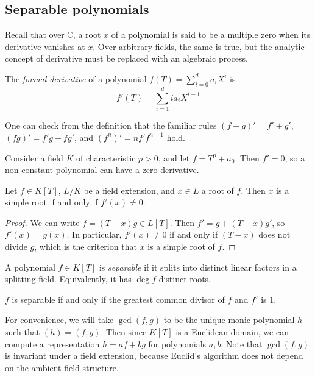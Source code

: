 \subsection{Separable polynomials}
Recall that over \( \mathbb C \), a root \( x \) of a polynomial is said to be a multiple zero when its derivative vanishes at \( x \).
Over arbitrary fields, the same is true, but the analytic concept of derivative must be replaced with an algebraic process.
\begin{definition}
	The \emph{formal derivative} of a polynomial \( f(T) = \sum_{i=0}^d a_i X^i \) is
	\[ f'(T) = \sum_{i=1}^d i a_i X^{i-1} \]
\end{definition}
\begin{remark}
	One can check from the definition that the familiar rules \( (f + g)' = f' + g' \), \( (fg)' = f'g + fg' \), and \( (f^n)' = nf'f^{n-1} \) hold.
\end{remark}
\begin{example}
	Consider a field \( K \) of characteristic \( p > 0 \), and let \( f = T^p + a_0 \).
	Then \( f' = 0 \), so a non-constant polynomial can have a zero derivative.
\end{example}
\begin{proposition}
	Let \( f \in K[T] \), \( L / K \) be a field extension, and \( x \in L \) a root of \( f \).
	Then \( x \) is a simple root if and only if \( f'(x) \neq 0 \).
\end{proposition}
\begin{proof}
	We can write \( f = (T-x)g \in L[T] \).
	Then \( f' = g + (T-x)g' \), so \( f'(x) = g(x) \).
	In particular, \( f'(x) \neq 0 \) if and only if \( (T-x) \) does not divide \( g \), which is the criterion that \( x \) is a simple root of \( f \).
\end{proof}
\begin{definition}
	A polynomial \( f \in K[T] \) is \emph{separable} if it splits into distinct linear factors in a splitting field.
	Equivalently, it has \( \deg f \) distinct roots.
\end{definition}
\begin{corollary}
	\( f \) is separable if and only if the greatest common divisor of \( f \) and \( f' \) is \( 1 \).
\end{corollary}
For convenience, we will take \( \gcd(f, g) \) to be the unique monic polynomial \( h \) such that \( (h) = (f, g) \).
Then since \( K[T] \) is a Euclidean domain, we can compute a representation \( h = af + bg \) for polynomials \( a, b \).
Note that \( \gcd(f, g) \) is invariant under a field extension, because Euclid's algorithm does not depend on the ambient field structure.
